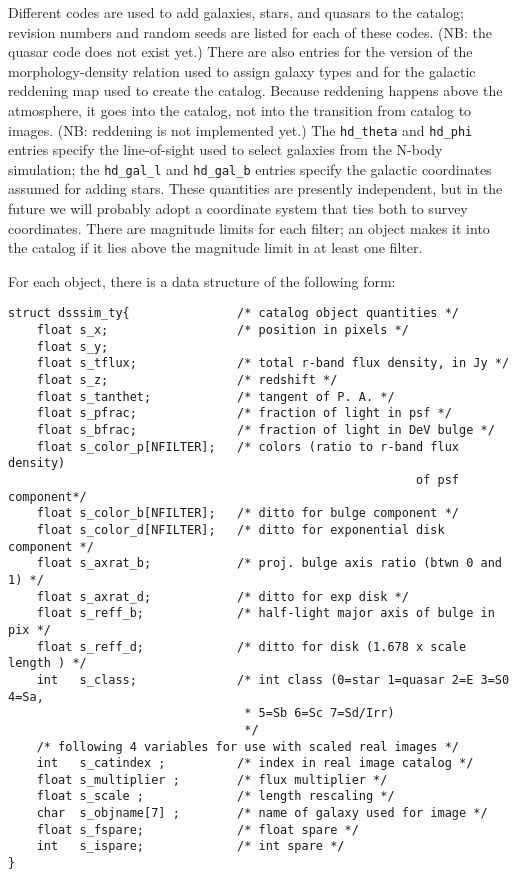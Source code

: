 Different codes are used to add galaxies, stars, and quasars to the catalog;
revision numbers and random seeds are listed for each of these codes.
(NB: the quasar code does not exist yet.)  There are also entries for
the version of the morphology-density relation used to assign galaxy
types and for the galactic reddening map used to create the catalog.  
Because reddening happens above the atmosphere, it goes into the catalog,
not into the transition from catalog to images.
(NB: reddening
is not implemented yet.)  The {\tt hd\_theta} and {\tt hd\_phi} entries
specify the line-of-sight used to select galaxies from the N-body simulation;
the {\tt hd\_gal\_l} and {\tt hd\_gal\_b} entries specify the galactic
coordinates assumed for adding stars.  These quantities are presently
independent, but in the future we will probably adopt a coordinate system
that ties both to survey coordinates.  There are magnitude limits for
each filter; an object makes it into the catalog if it lies above the
magnitude limit in at least one filter.

For each object, there is a data structure of the following form:
\begin{verbatim}
struct dsssim_ty{	    	    /* catalog object quantities */
    float s_x;                  /* position in pixels */
    float s_y;
    float s_tflux;              /* total r-band flux density, in Jy */
    float s_z;                  /* redshift */
    float s_tanthet;            /* tangent of P. A. */
    float s_pfrac;              /* fraction of light in psf */
    float s_bfrac;              /* fraction of light in DeV bulge */
    float s_color_p[NFILTER];   /* colors (ratio to r-band flux density) 
                                                         of psf component*/
    float s_color_b[NFILTER];   /* ditto for bulge component */
    float s_color_d[NFILTER];   /* ditto for exponential disk component */
    float s_axrat_b;            /* proj. bulge axis ratio (btwn 0 and 1) */
    float s_axrat_d;            /* ditto for exp disk */
    float s_reff_b;             /* half-light major axis of bulge in pix */
    float s_reff_d;             /* ditto for disk (1.678 x scale length ) */
    int   s_class;              /* int class (0=star 1=quasar 2=E 3=S0 4=Sa,
                                 * 5=Sb 6=Sc 7=Sd/Irr)
                                 */    
    /* following 4 variables for use with scaled real images */
    int   s_catindex ;          /* index in real image catalog */
    float s_multiplier ;        /* flux multiplier */
    float s_scale ;             /* length rescaling */
    char  s_objname[7] ;        /* name of galaxy used for image */
    float s_fspare;             /* float spare */
    int   s_ispare;             /* int spare */
}
\end{verbatim}

